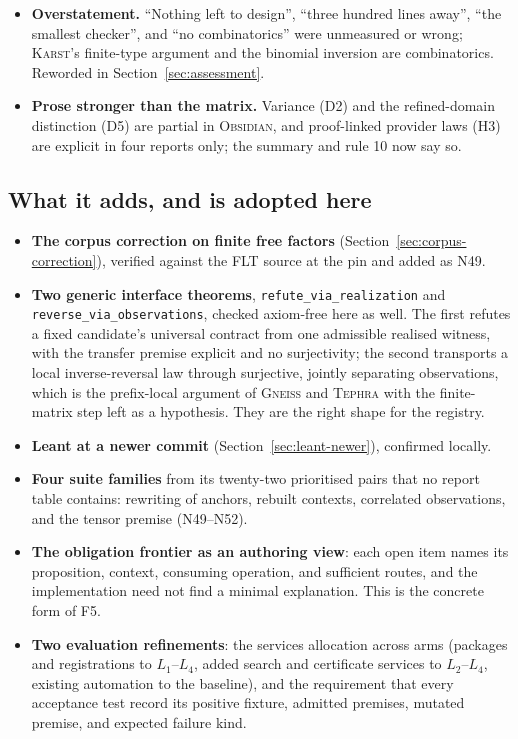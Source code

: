 \documentclass[11pt,a4paper]{article}
\newcommand{\code}[1]{\nolinkurl{#1}}
\newcommand{\Gn}{\textsc{Gneiss}}
\newcommand{\Ks}{\textsc{Karst}}
\newcommand{\Ob}{\textsc{Obsidian}}
\newcommand{\Tp}{\textsc{Tephra}}
\theoremstyle{definition}
\begin{document}
\begin{itemize}
\item \textbf{Overstatement.} ``Nothing left to design'', ``three hundred lines away'', ``the smallest checker'', and ``no combinatorics'' were unmeasured or wrong; \Ks's finite-type argument and the binomial inversion are combinatorics. Reworded in Section~\ref{sec:assessment}.
\item \textbf{Prose stronger than the matrix.} Variance (D2) and the refined-domain distinction (D5) are partial in \Ob, and proof-linked provider laws (H3) are explicit in four reports only; the summary and rule 10 now say so.
\end{itemize}

\subsection{What it adds, and is adopted here}
\begin{itemize}
\item \textbf{The corpus correction on finite free factors} (Section~\ref{sec:corpus-correction}), verified against the FLT source at the pin and added as N49.
\item \textbf{Two generic interface theorems}, \code{refute_via_realization} and \code{reverse_via_observations}, checked axiom-free here as well. The first refutes a fixed candidate's universal contract from one admissible realised witness, with the transfer premise explicit and no surjectivity; the second transports a local inverse-reversal law through surjective, jointly separating observations, which is the prefix-local argument of \Gn{} and \Tp{} with the finite-matrix step left as a hypothesis. They are the right shape for the registry.
\item \textbf{Leant at a newer commit} (Section~\ref{sec:leant-newer}), confirmed locally.
\item \textbf{Four suite families} from its twenty-two prioritised pairs that no report table contains: rewriting of anchors, rebuilt contexts, correlated observations, and the tensor premise (N49--N52).
\item \textbf{The obligation frontier as an authoring view}: each open item names its proposition, context, consuming operation, and sufficient routes, and the implementation need not find a minimal explanation. This is the concrete form of F5.
\item \textbf{Two evaluation refinements}: the services allocation across arms (packages and registrations to $L_1$--$L_4$, added search and certificate services to $L_2$--$L_4$, existing automation to the baseline), and the requirement that every acceptance test record its positive fixture, admitted premises, mutated premise, and expected failure kind.
\end{itemize}
\end{document}
